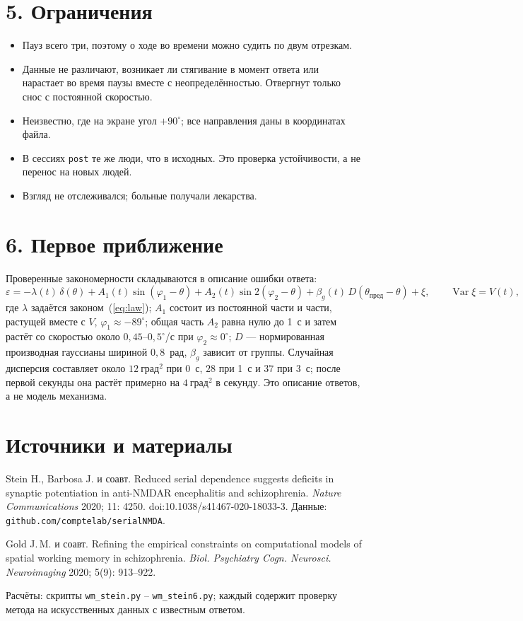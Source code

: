 \documentclass[10pt,a4paper]{article}
\newcommand{\gr}{^{\circ}}
\newcommand{\dsq}{\text{град}^2}
\begin{document}
\section*{5. Ограничения}

\begin{itemize}
\item Пауз всего три, поэтому о ходе во времени можно судить по двум отрезкам.
\item Данные не различают, возникает ли стягивание в момент ответа или нарастает во время паузы вместе
с неопределённостью. Отвергнут только снос с постоянной скоростью.
\item Неизвестно, где на экране угол $+90\gr$; все направления даны в координатах файла.
\item В сессиях \texttt{post} те же люди, что в исходных. Это проверка устойчивости, а не перенос на новых людей.
\item Взгляд не отслеживался; больные получали лекарства.
\end{itemize}

\section*{6. Первое приближение}

Проверенные закономерности складываются в описание ошибки ответа:
\begin{equation}
\varepsilon=-\lambda(t)\,\delta(\theta)+A_1(t)\sin(\varphi_1-\theta)+A_2(t)\sin 2(\varphi_2-\theta)
+\beta_g(t)\,D(\theta_{\text{пред}}-\theta)+\xi ,\qquad \operatorname{Var}\xi=V(t),
\end{equation}
где $\lambda$ задаётся законом~(\ref{eq:law}); $A_1$ состоит из постоянной части и части, растущей вместе с $V$,
$\varphi_1\approx-89\gr$; общая часть $A_2$ равна нулю до 1~с и затем растёт со скоростью около $0,45$--$0,5\gr$/с
при $\varphi_2\approx0\gr$; $D$ --- нормированная производная гауссианы шириной $0,8$~рад, $\beta_g$ зависит от
группы. Случайная дисперсия составляет около $12~\dsq$ при 0~с, $28$ при 1~с и $37$ при 3~с; после первой секунды она
растёт примерно на $4~\dsq$ в секунду. Это описание ответов, а не модель механизма.

\section*{Источники и материалы}

{\small
Stein H., Barbosa J. и соавт. Reduced serial dependence suggests deficits in synaptic potentiation in anti-NMDAR
encephalitis and schizophrenia. \emph{Nature Communications} 2020; 11: 4250. doi:10.1038/s41467-020-18033-3.
Данные: \texttt{github.com/comptelab/serialNMDA}.

Gold J.\,M. и соавт. Refining the empirical constraints on computational models of spatial working memory in
schizophrenia. \emph{Biol. Psychiatry Cogn. Neurosci. Neuroimaging} 2020; 5(9): 913--922.

Расчёты: скрипты \texttt{wm\_stein.py} -- \texttt{wm\_stein6.py}; каждый содержит проверку метода на искусственных
данных с известным ответом.
}
\end{document}
